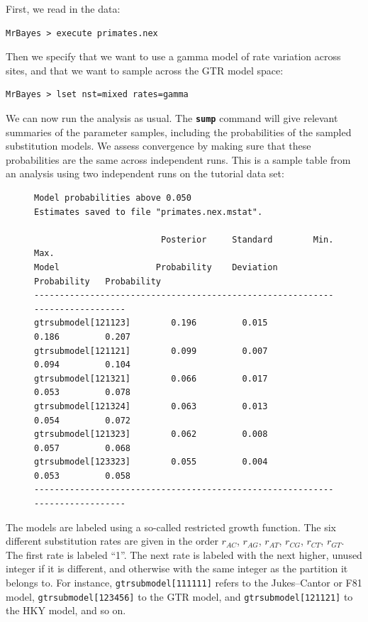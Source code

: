 \documentclass[12pt]{book}
\newcommand{\ttt}[1]{\texttt{#1}}
\newcommand{\tb}[1]{\ttt{\textbf{#1}}}
\begin{document}
First, we read in the data:

\begin{Verbatim}
MrBayes > execute primates.nex
\end{Verbatim}

Then we specify that we want to use a gamma model of rate variation across sites, and that we want
to sample across the GTR model space:

\begin{Verbatim}
MrBayes > lset nst=mixed rates=gamma
\end{Verbatim}

We can now run the analysis as usual. The \tb{sump} command will give relevant summaries of the
parameter samples, including the probabilities of the sampled substitution models. We assess
convergence by making sure that these probabilities are the same across independent runs. This is a
sample table from an analysis using two independent runs on the tutorial data set:

\begin{figure}[H]
\centering
\begin{BVerbatim}
Model probabilities above 0.050
Estimates saved to file "primates.nex.mstat".

                         Posterior     Standard        Min.          Max.
Model                   Probability    Deviation    Probability   Probability
-----------------------------------------------------------------------------
gtrsubmodel[121123]        0.196         0.015         0.186         0.207
gtrsubmodel[121121]        0.099         0.007         0.094         0.104
gtrsubmodel[121321]        0.066         0.017         0.053         0.078
gtrsubmodel[121324]        0.063         0.013         0.054         0.072
gtrsubmodel[121323]        0.062         0.008         0.057         0.068
gtrsubmodel[123323]        0.055         0.004         0.053         0.058
-----------------------------------------------------------------------------
\end{BVerbatim}
\end{figure}

The models are labeled using a so-called restricted growth function. The six different substitution
rates are given in the order $r_{AC}$, $r_{AG}$, $r_{AT}$, $r_{CG}$, $r_{CT}$, $r_{GT}$. The first
rate is labeled ``1''. The next rate is labeled with the next higher, unused integer if it is
different, and otherwise with the same integer as the partition it belongs to. For instance,
\texttt{gtrsubmodel[111111]} refers to the Jukes--Cantor or F81 model, \texttt{gtrsubmodel[123456]}
to the GTR model, and \texttt{gtrsubmodel[121121]} to the HKY model, and so on.
\end{document}
